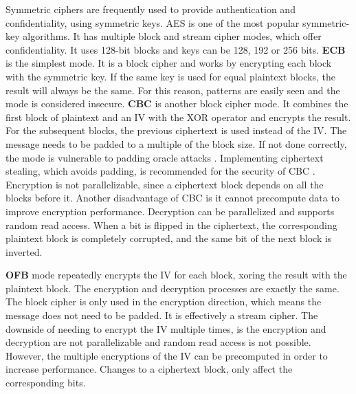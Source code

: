 Symmetric ciphers are frequently used to provide authentication and confidentiality, using symmetric keys.
\ac{AES} is one of the most popular symmetric-key algorithms. It has multiple block and stream cipher modes, which offer confidentiality. It uses 128-bit blocks and keys can be 128, 192 or 256 bits.
\textbf{\ac{ECB}} is the simplest mode. It is a block cipher and works by encrypting each block with the symmetric key. If the same key is used for equal plaintext blocks, the result will always be the same. For this reason, patterns are easily seen and the mode is considered insecure.
\textbf{\ac{CBC}} is another block cipher mode. It combines the first block of plaintext and an \ac{IV} with the XOR operator and encrypts the result. For the subsequent blocks, the previous ciphertext is used instead of the IV. The message needs to be padded to a multiple of the block size. If not done correctly, the mode is vulnerable to padding oracle attacks \cite{paddingoracle}. Implementing ciphertext stealing, which avoids padding, is recommended for the security of \ac{CBC} \cite{ciphertextstealing}.
Encryption is not parallelizable, since a ciphertext block depends on all the blocks before it. Another disadvantage of \ac{CBC} is it cannot precompute data to improve encryption performance. Decryption can be parallelized and supports random read access.
When a bit is flipped in the ciphertext, the corresponding plaintext block is completely corrupted, and the same bit of the next block is inverted.

\textbf{\ac{OFB}} mode repeatedly encrypts the IV for each block, xoring the result with the plaintext block. The encryption and decryption processes are exactly the same.
The block cipher is only used in the encryption direction, which means the message does not need to be padded. It is effectively a stream cipher.
The downside of needing to encrypt the IV multiple times, is the encryption and decryption are not parallelizable and random read access is not possible. However, the multiple encryptions of the IV can be precomputed in order to increase performance.
Changes to a ciphertext block, only affect the corresponding bits.

